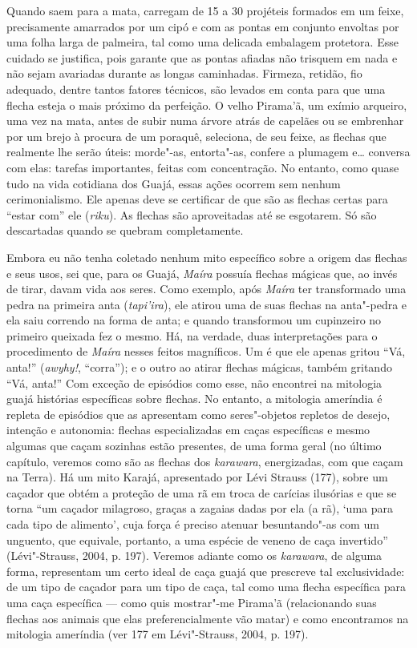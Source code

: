 Quando saem para a mata, carregam de 15 a 30 projéteis formados em um
feixe, precisamente amarrados por um cipó e com as pontas em conjunto
envoltas por uma folha larga de palmeira, tal como uma delicada
embalagem protetora. Esse cuidado se justifica, pois garante que as
pontas afiadas não trisquem em nada e não sejam avariadas durante as
longas caminhadas. Firmeza, retidão, fio adequado, dentre tantos fatores
técnicos, são levados em conta para que uma flecha esteja o mais próximo
da perfeição. O velho Pirama'ã, um exímio arqueiro, uma vez na mata,
antes de subir numa árvore atrás de capelães ou se embrenhar por um
brejo à procura de um poraquê, seleciona, de seu feixe, as flechas que
realmente lhe serão úteis: morde"-as, entorta"-as, confere a plumagem e\ldots{}
conversa com elas: tarefas importantes, feitas com concentração. No
entanto, como quase tudo na vida cotidiana dos Guajá, essas ações
ocorrem sem nenhum cerimonialismo. Ele apenas deve se certificar de que
são as flechas certas para ``estar com'' ele (\emph{riku}). As flechas são
aproveitadas até se esgotarem. Só são descartadas quando se quebram
completamente.

Embora eu não tenha coletado nenhum mito específico sobre a origem das
flechas e seus usos, sei que, para os Guajá, \emph{Maíra} possuía
flechas mágicas que, ao invés de tirar, davam vida aos seres. Como
exemplo, após \emph{Maíra} ter transformado uma pedra na primeira anta
(\emph{tapi'ira}), ele atirou uma de suas flechas na anta"-pedra e ela
saiu correndo na forma de anta; e quando transformou um cupinzeiro no
primeiro queixada fez o mesmo. Há, na verdade, duas interpretações para
o procedimento de \emph{Maíra} nesses feitos magníficos. Um é que ele
apenas gritou ``Vá, anta!'' (\emph{awyhy!}, ``corra''); e o outro ao atirar
flechas mágicas, também gritando ``Vá, anta!'' Com exceção de episódios
como esse, não encontrei na mitologia guajá
histórias específicas sobre flechas. No entanto, a mitologia ameríndia é
repleta de episódios que as apresentam como seres"-objetos repletos de
desejo, intenção e autonomia: flechas especializadas em caças
específicas e mesmo algumas que caçam sozinhas estão presentes, de uma
forma geral (no último capítulo, veremos como são as flechas dos
\emph{karawara}, energizadas, com que caçam na Terra). Há um mito
Karajá, apresentado por Lévi Strauss (177), sobre um caçador que obtém
a proteção de uma rã em troca de carícias ilusórias e que se torna ``um
caçador milagroso, graças a zagaias dadas por ela (a rã), `uma para
cada tipo de alimento', cuja força é preciso atenuar
besuntando"-as com um unguento, que equivale, portanto, a uma espécie de
veneno de caça invertido'' (Lévi"-Strauss, 2004, p. 197). Veremos adiante
como os \emph{karawara}, de alguma forma, representam um certo ideal de
caça guajá que prescreve tal exclusividade: de um tipo de caçador para
um tipo de caça, tal como uma flecha específica para uma caça específica
--- como quis mostrar"-me Pirama'ã (relacionando suas flechas aos animais
que elas preferencialmente vão matar) e como encontramos na mitologia
ameríndia (ver 177 em Lévi"-Strauss, 2004, p. 197).

